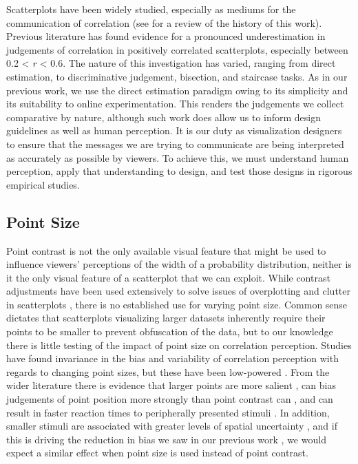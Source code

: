 \documentclass{vgtc}                          %
\begin{document}
Scatterplots have been widely studied, especially as mediums for the communication
of correlation (see \cite{strain_2023} for a review of the history of this work).
Previous literature has found evidence for a pronounced underestimation in judgements
of correlation in positively correlated scatterplots, especially between 0.2 \textless{} \emph{r} \textless{} 0.6. The
nature of this investigation has varied, ranging from direct estimation,
to discriminative judgement, bisection, and staircase tasks. As in our previous work,
we use the direct estimation paradigm owing to its simplicity and its suitability
to online experimentation. This renders the judgements we collect
comparative by nature, although such work does allow us to inform design guidelines as
well as human perception. It is our duty as visualization designers to ensure that the
messages we are trying to communicate are being interpreted as accurately as possible
by viewers. To achieve this, we must understand human perception, apply that understanding
to design, and test those designs in rigorous empirical studies.

\hypertarget{point-size}{%
\subsection{Point Size}\label{point-size}}

Point contrast is not the only available visual feature that might be used
to influence viewers' perceptions of the width of a probability distribution, neither is
it the only visual feature of a scatterplot that we can exploit. While
contrast adjustments have been used extensively to solve issues of overplotting and clutter
in scatterplots \cite{matejka_2015, bertini_2004}, there is no established use for
varying point size. Common sense dictates that scatterplots visualizing larger
datasets inherently require their points to be smaller to prevent obfuscation of the data,
but to our knowledge there is little testing of the impact of point size on correlation perception.
Studies have found invariance in the bias and variability of correlation
perception with regards to changing point sizes,
but these have been low-powered \cite{rensink_2012, rensink_2014}. From the wider literature there is evidence that larger points are more salient \cite{healey_2012}, can bias judgements of point position more strongly than point contrast can \cite{hong_2021}, and can result in faster reaction times to peripherally presented stimuli \cite{grice_1983}. In addition, smaller stimuli are associated with greater levels of spatial uncertainty \cite{alais_2004}, and if this
is driving the reduction in bias we saw in our previous work \cite{strain_2023},
we would expect a similar effect when point size is used instead of point contrast.
\end{document}

